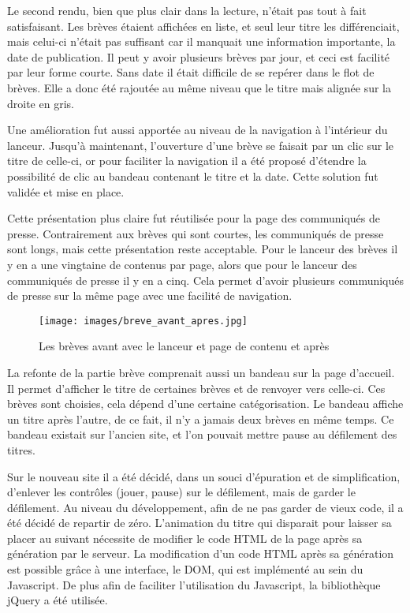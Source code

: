 \documentclass[12pt,a4paper]{article}
\begin{document}
\medskip
Le second rendu, bien que plus clair dans la lecture, n'était pas tout à fait satisfaisant. Les brèves étaient affichées en liste, et seul leur titre les différenciait, mais celui-ci n'était pas suffisant car il manquait une information importante, la date de publication. Il peut y avoir plusieurs brèves par jour, et ceci est facilité par leur forme courte. Sans date il était difficile de se repérer dans le flot de brèves. Elle a donc été rajoutée au même niveau que le titre mais alignée sur la droite en gris.\par
Une amélioration fut aussi apportée au niveau de la navigation à l'intérieur du lanceur. Jusqu'à maintenant, l'ouverture d'une brève se faisait par un clic sur le titre de celle-ci, or pour faciliter la navigation il a été proposé d'étendre la possibilité de clic au bandeau contenant le titre et la date. Cette solution fut validée et mise en place.\par
\medskip
Cette présentation plus claire fut réutilisée pour la page des communiqués de presse. Contrairement aux brèves qui sont courtes, les communiqués de presse sont longs, mais cette présentation reste acceptable. Pour le lanceur des brèves il y en a une vingtaine de contenus par page, alors que pour le lanceur des communiqués de presse il y en a cinq. Cela permet d'avoir plusieurs communiqués de presse sur la même page avec une facilité de navigation.\par
\begin{figure}[h!]
\centering\texttt{[image: images/breve\_avant\_apres.jpg]} 
\caption{Les brèves avant avec le lanceur et page de contenu et après}
\end{figure}
\bigskip 
La refonte de la partie brève comprenait aussi un bandeau sur la page d'accueil. Il permet d'afficher le titre de certaines brèves et de renvoyer vers celle-ci. Ces brèves sont choisies, cela dépend d'une certaine catégorisation. Le bandeau affiche un titre après l'autre, de ce fait, il n'y a jamais deux brèves en même temps. Ce bandeau existait sur l'ancien site, et l'on pouvait mettre pause au défilement des titres.\par 
Sur le nouveau site il a été décidé, dans un souci d'épuration et de simplification, d'enlever les contrôles (jouer, pause) sur le défilement, mais de garder le défilement. Au niveau du développement, afin de ne pas garder de vieux code, il a été décidé de repartir de zéro. L'animation du titre qui disparait pour laisser sa placer au suivant nécessite de modifier le code \gls{HTML} de la page après sa génération par le serveur. La modification d'un code \gls{HTML} après sa génération est possible grâce à une interface, le DOM, qui est implémenté au sein du Javascript. De plus afin de faciliter l'utilisation du Javascript, la bibliothèque jQuery a été utilisée.\par 
\end{document}
